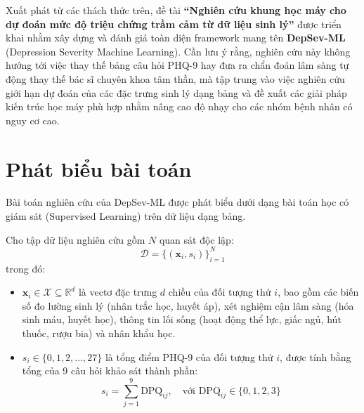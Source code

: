 Xuất phát từ các thách thức trên, đề tài \textbf{“Nghiên cứu khung học máy cho dự đoán mức độ triệu chứng trầm cảm từ dữ liệu sinh lý”} được triển khai nhằm xây dựng và đánh giá toàn diện framework mang tên \textbf{DepSev-ML} (Depression Severity Machine Learning). Cần lưu ý rằng, nghiên cứu này không hướng tới việc thay thế bảng câu hỏi PHQ-9 hay đưa ra chẩn đoán lâm sàng tự động thay thế bác sĩ chuyên khoa tâm thần, mà tập trung vào việc nghiên cứu giới hạn dự đoán của các đặc trưng sinh lý dạng bảng và đề xuất các giải pháp kiến trúc học máy phù hợp nhằm nâng cao độ nhạy cho các nhóm bệnh nhân có nguy cơ cao.

\section{Phát biểu bài toán}
\label{sec:phat-bieu-bai-toan}

Bài toán nghiên cứu của DepSev-ML được phát biểu dưới dạng bài toán học có giám sát (Supervised Learning) trên dữ liệu dạng bảng.

Cho tập dữ liệu nghiên cứu gồm $N$ quan sát độc lập:
\begin{equation}
    \mathcal{D} = \{(\mathbf{x}_i, s_i)\}_{i=1}^N
\end{equation}
trong đó:
\begin{itemize}
    \item $\mathbf{x}_i \in \mathcal{X} \subseteq \mathbb{R}^d$ là vectơ đặc trưng $d$ chiều của đối tượng thứ $i$, bao gồm các biến số đo lường sinh lý (nhân trắc học, huyết áp), xét nghiệm cận lâm sàng (hóa sinh máu, huyết học), thông tin lối sống (hoạt động thể lực, giấc ngủ, hút thuốc, rượu bia) và nhân khẩu học.
    \item $s_i \in \{0, 1, 2, \dots, 27\}$ là tổng điểm PHQ-9 của đối tượng thứ $i$, được tính bằng tổng của 9 câu hỏi khảo sát thành phần:
    \begin{equation}
        s_i = \sum_{j=1}^9 \text{DPQ}_{ij}, \quad \text{với } \text{DPQ}_{ij} \in \{0, 1, 2, 3\}
    \end{equation}
\end{itemize}

